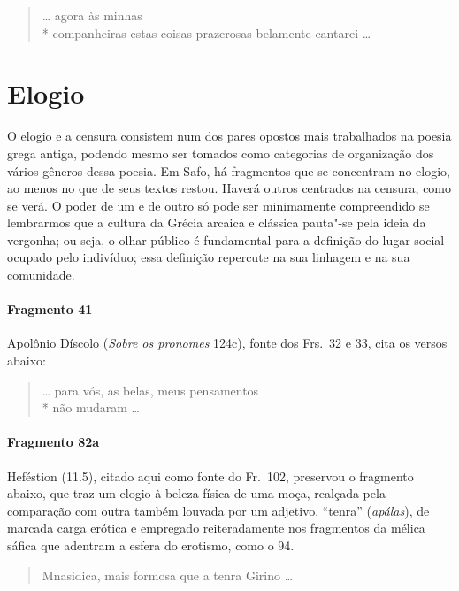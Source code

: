 \begin{verse}
\ldots{} agora às minhas\\*
companheiras estas coisas prazerosas \qb{}belamente cantarei \ldots{}
\end{verse}


\section{Elogio}

O elogio e a censura consistem num dos pares opostos mais trabalhados na poesia
grega antiga, podendo mesmo ser tomados como categorias de organização dos
vários gêneros dessa poesia. Em Safo, há fragmentos que se concentram no
elogio, ao menos no que de seus textos restou. Haverá outros centrados na
censura, como se verá. O poder de um e de outro só pode ser
minimamente compreendido se lembrarmos que a cultura da Grécia arcaica e
clássica pauta"-se pela ideia da vergonha; ou seja, o olhar público é
fundamental para a definição do lugar social ocupado pelo indivíduo; essa
definição repercute na sua linhagem e na sua comunidade. 

\paragraph{Fragmento 41}

{\small Apolônio Díscolo (\textit{Sobre os pronomes} 124c), fonte dos Frs.~32 e 33, cita os versos abaixo:}

\begin{verse}
\ldots{} para vós, as belas, meus pensamentos\\*
não mudaram \ldots{}
\end{verse}

\paragraph{Fragmento 82a}

{\small Heféstion (11.5), citado aqui como fonte do Fr.~102, preservou o fragmento abaixo, que traz
um elogio à beleza física de uma moça, realçada pela comparação com outra
também louvada por um adjetivo, ``tenra” (\textit{apálas}), de marcada
carga erótica e empregado reiteradamente nos fragmentos da mélica sáfica que
adentram a esfera do erotismo, como o 94.}

\begin{verse}
Mnasidica, mais formosa que a tenra \qb{}Girino \ldots{}
\end{verse}


